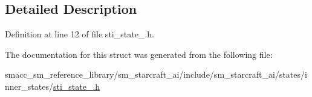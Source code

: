 \subsection{Detailed Description}


Definition at line 12 of file sti\+\_\+state\+\_.\+h.



The documentation for this struct was generated from the following file\+:\begin{DoxyCompactItemize}
\item 
smacc\+\_\+sm\+\_\+reference\+\_\+library/sm\+\_\+starcraft\+\_\+ai/include/sm\+\_\+starcraft\+\_\+ai/states/inner\+\_\+states/\hyperlink{sm__starcraft__ai_2include_2sm__starcraft__ai_2states_2inner__states_2sti__state__2_8h}{sti\+\_\+state\+\_.\+h}\end{DoxyCompactItemize}
